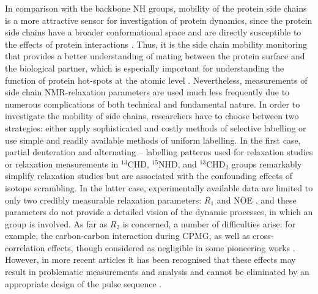 \documentclass[twocolumn]{svjour3}           %
\begin{document}
In comparison with the backbone NH groups, mobility of the protein side 
chains is a more attractive sensor for investigation of protein dynamics, 
since the protein side chains have a broader conformational space and are 
directly susceptible to the effects of protein interactions 
\cite{igumenova_characterization_2006,paquin_multiple-timescale_2008,trbovic_protein_2009,yang_probing_2011,weininger_13c_2012,ferrage_chapter_2017}. 
Thus, it is the side chain mobility 
monitoring that provides a better understanding of mating between the 
protein surface and the biological partner, which is especially important 
for understanding the function of protein hot-spots at the atomic level 
\cite{zerbe_relationship_2012,cukuroglu_hot_2014,watkins_side-chain_2016}. 
Nevertheless, measurements of side chain NMR-relaxation parameters are used 
much less frequently due to numerous complications of both technical and 
fundamental nature. In order to investigate the mobility of side chains, 
researchers have to choose between two strategies: either apply 
sophisticated and costly methods of selective labelling or use simple and 
readily available methods of uniform \nclab{} labelling. In the 
first case, partial deuteration and alternating \clab--\cnolab{} labelling 
patterns used for \dlab{} relaxation studies or \nclab{} relaxation 
measurements \cite{kushlan_proton-detected_1993,lemaster_dynamical_1996} 
in $^{13}\text{CHD}$, $^{15}\text{NHD}$, and $^{13}\text{CHD}_2$ 
groups remarkably simplify \cite{lemaster_nmr_1999} relaxation studies 
but are associated with the confounding effects of isotope scrambling. 
In the latter case, experimentally available data are limited to only 
two credibly measurable 
\nclab{} relaxation parameters: $R_1$ and NOE 
\cite{yang_probing_2011,ferrage_chapter_2017}, 
and these parameters do not provide a detailed vision of the 
dynamic processes, in which an \XHtwo{} group is involved. As far as 
$R_2$ is concerned, a number of difficulties arise: for example, the 
carbon-carbon \oneJcc{} interaction during {CPMG}, as well as 
cross-correlation effects, though considered as negligible in some pioneering works 
\cite{buck_structural_1995}. However, in more recent articles it 
has been recognised that these effects may result in problematic 
measurements and analysis and cannot be eliminated by an 
appropriate design of the pulse sequence
\cite{kumar_cross-correlations_2000,yang_probing_2011}.
\end{document}
